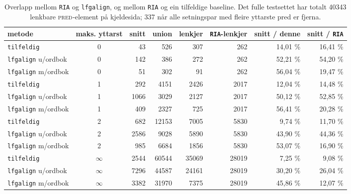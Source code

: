 \documentclass[11pt,a4paper,oneside,draft]{report}
\newcommand{\F}[2]{\textsc{#1}\ensuremath{_{#2}}}
\newcommand{\PRED}{\F{pred}{}}
\begin{document}
\begin{table}[htb]
\caption{\label{tbl:RIA}Overlapp mellom \texttt{RIA} og \texttt{lfgalign}, og mellom \texttt{RIA} og ein tilfeldige baseline. Det fulle testsettet har totalt 40343 lenkbare \PRED{}-element på kjeldesida; 337 når alle setningspar med fleire yttarste pred er fjerna.}
\begin{center}
\begin{tabular}{lcrrrrrr}
 metode                      &  maks. yttarst  &  snitt  &  union  &  lenkjer  &  \texttt{RIA}-lenkjer  &  snitt / denne  &  snitt / \texttt{RIA}  \\
\hline
 \texttt{tilfeldig}          &              0  &     43  &    526  &      307  &                   262  &  14,01 \%       &  16,41 \%              \\
 \texttt{lfgalign} u/ordbok  &              0  &    142  &    386  &      272  &                   262  &  52,21 \%       &  54,20 \%              \\
 \texttt{lfgalign} m/ordbok  &              0  &     51  &    302  &       91  &                   262  &  56,04 \%       &  19,47 \%              \\
\hline
 \texttt{tilfeldig}          &              1  &    292  &   4151  &     2426  &                  2017  &  12,04 \%       &  14,48 \%              \\
 \texttt{lfgalign} u/ordbok  &              1  &   1066  &   3029  &     2127  &                  2017  &  50,12 \%       &  52,85 \%              \\
 \texttt{lfgalign} m/ordbok  &              1  &    409  &   2327  &      725  &                  2017  &  56,41 \%       &  20,28 \%              \\
\hline
 \texttt{tilfeldig}          &              2  &    682  &  12153  &     7005  &                  5830  &  9,74 \%        &  11,70 \%              \\
 \texttt{lfgalign} u/ordbok  &              2  &   2586  &   9028  &     5890  &                  5830  &  43,90 \%       &  44,36 \%              \\
 \texttt{lfgalign} m/ordbok  &              2  &    985  &   6684  &     1856  &                  5830  &  53,07 \%       &  16,90 \%              \\
\hline
 \texttt{tilfeldig}          &       $\infty$  &   2544  &  60544  &    35069  &                 28019  &  7,25 \%        &  9,08 \%               \\
 \texttt{lfgalign} u/ordbok  &       $\infty$  &   7296  &  44587  &    24161  &                 28019  &  30,20 \%       &  26,04 \%              \\
 \texttt{lfgalign} m/ordbok  &       $\infty$  &   3382  &  31970  &     7375  &                 28019  &  45,86 \%       &  12,07 \%              \\
\end{tabular}
\end{center}
\end{table}
\end{document}
